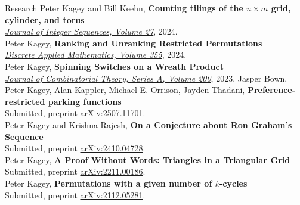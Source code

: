 \documentclass{cv} %
\begin{document}
\begin{rSection}{Research}
  Peter Kagey and Bill Keehn, \textbf{Counting tilings of the $n \times m$ grid, cylinder, and torus}\\
  \href{https://cs.uwaterloo.ca/journals/JIS/VOL27/Kagey/kagey6.html}{\textit{Journal of Integer Sequences, Volume 27}}, 2024.
  \\
  Peter Kagey, \textbf{Ranking and Unranking Restricted Permutations}\\
  \href{https://doi.org/10.1016/j.dam.2024.05.010}{\textit{Discrete Applied Mathematics, Volume 355}}, 2024.
  \\
  Peter Kagey, \textbf{Spinning Switches on a Wreath Product} \\
  \href{https://doi.org/10.1016/j.jcta.2023.105795}{\textit{Journal of Combinatorial Theory, Series A, Volume 200}}, 2023.
  Jasper Bown, Peter Kagey, Alan Kappler, Michael E. Orrison, Jayden Thadani, \textbf{Preference-restricted parking functions}\\
  Submitted, preprint \href{https://arxiv.org/abs/2507.11701}{arXiv:2507.11701}.
  \\
  Peter Kagey and Krishna Rajesh, \textbf{	On a Conjecture about Ron Graham's Sequence} \\
  Submitted, preprint \href{https://arxiv.org/abs/2410.04728}{arXiv:2410.04728}.
  \\
  Peter Kagey, \textbf{A Proof Without Words: Triangles in a Triangular Grid} \\
  Submitted, preprint \href{https://arxiv.org/abs/2211.00186}{arXiv:2211.00186}.\\
  Peter Kagey, \textbf{Permutations with a given number of $k$-cycles} \\
  Submitted, preprint \href{https://arxiv.org/abs/2112.05281}{arXiv:2112.05281}.\\
\end{rSection}
\end{document}
